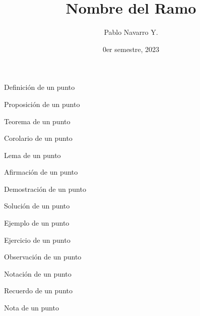 \documentclass{apuntes}
\title{Nombre del Ramo}
\author{Pablo Navarro Y.}
\date{0er semestre, 2023}
\begin{document}
\renewcommand{\onlyinsubfile}[1]{}
\renewcommand{\notinsubfile}[1]{#1}

\maketitle

\begin{definicion}
  Definición de un punto
\end{definicion}

\begin{prop}
  Proposición de un punto
\end{prop}

\begin{teorema}
  Teorema de un punto
\end{teorema}

\begin{corolario}
  Corolario de un punto
\end{corolario}

\begin{lema}
  Lema de un punto
\end{lema}

\begin{aff}
  Afirmación de un punto
\end{aff}

\begin{dem}
  Demostración de un punto
\end{dem}

\begin{sol}
  Solución de un punto
\end{sol}

\begin{ejemplo}
  Ejemplo de un punto
\end{ejemplo}

\begin{ejercicio}
  Ejercicio de un punto
\end{ejercicio}

\begin{pregunta}

\end{pregunta}

\begin{obs}
  Observación de un punto
\end{obs}

\begin{notacion}
  Notación de un punto
\end{notacion}

\begin{recuerdo}
  Recuerdo de un punto
\end{recuerdo}

\begin{nota}
  Nota de un punto
\end{nota}
\end{document}

